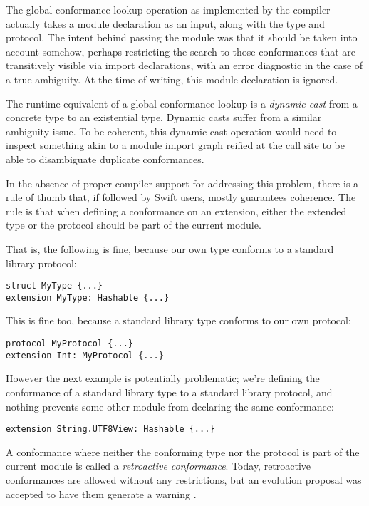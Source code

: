 \documentclass[../generics]{subfiles}
\begin{document}
The global conformance lookup operation as implemented by the compiler actually takes a module declaration as an input, along with the type and protocol. The intent behind passing the module was that it should be taken into account somehow, perhaps restricting the search to those conformances that are transitively visible via import declarations, with an error diagnostic in the case of a true ambiguity. At the time of writing, this module declaration is ignored.

The runtime equivalent of a global conformance lookup is a \emph{dynamic cast} from a concrete type to an existential type. Dynamic casts suffer from a similar ambiguity issue. To be coherent, this dynamic cast operation would need to inspect something akin to a module import graph reified at the call site to be able to disambiguate duplicate conformances.

In the absence of proper compiler support for addressing this problem, there is a rule of thumb that, if followed by Swift users, mostly guarantees coherence. The rule is that when defining a conformance on an extension, either the extended type or the protocol should be part of the current module.

That is, the following is fine, because our own type conforms to a standard library protocol:
\begin{Verbatim}
struct MyType {...}
extension MyType: Hashable {...}
\end{Verbatim}
This is fine too, because a standard library type conforms to our own protocol:
\begin{Verbatim}
protocol MyProtocol {...}
extension Int: MyProtocol {...}
\end{Verbatim}

However the next example is potentially problematic; we're defining the conformance of a standard library type to a standard library protocol, and nothing prevents some other module from declaring the same conformance:
\begin{Verbatim}
extension String.UTF8View: Hashable {...}
\end{Verbatim}

A conformance where neither the conforming type nor the protocol is part of the current module is called a \emph{retroactive conformance}. Today, retroactive conformances are allowed without any restrictions, but an evolution proposal was accepted to have them generate a warning \cite{se0364}.
\end{document}
